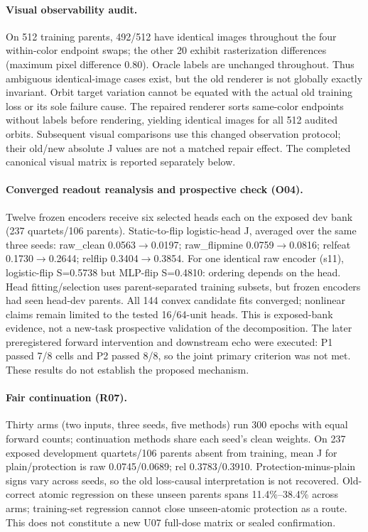 \paragraph{Visual observability audit.} On 512 training parents, 492/512 have identical images throughout the four within-color endpoint swaps; the other 20 exhibit rasterization differences (maximum pixel difference 0.80). Oracle labels are unchanged throughout. Thus ambiguous identical-image cases exist, but the old renderer is not globally exactly invariant. Orbit target variation cannot be equated with the actual old training loss or its sole failure cause. The repaired renderer sorts same-color endpoints without labels before rendering, yielding identical images for all 512 audited orbits. Subsequent visual comparisons use this changed observation protocol; their old/new absolute J values are not a matched repair effect. The completed canonical visual matrix is reported separately below.
\paragraph{Converged readout reanalysis and prospective check (O04).} Twelve frozen encoders receive six selected heads each on the exposed dev bank (237 quartets/106 parents). Static-to-flip logistic-head J, averaged over the same three seeds: raw\_clean 0.0563$\to$0.0197; raw\_flipmine 0.0759$\to$0.0816; relfeat 0.1730$\to$0.2644; relflip 0.3404$\to$0.3854. For one identical raw encoder (s11), logistic-flip S=0.5738 but MLP-flip S=0.4810: ordering depends on the head. Head fitting/selection uses parent-separated training subsets, but frozen encoders had seen head-dev parents. All 144 convex candidate fits converged; nonlinear claims remain limited to the tested 16/64-unit heads. This is exposed-bank evidence, not a new-task prospective validation of the decomposition. The later preregistered forward intervention and downstream echo were executed: P1 passed 7/8 cells and P2 passed 8/8, so the joint primary criterion was not met. These results do not establish the proposed mechanism.
\paragraph{Fair continuation (R07).} Thirty arms (two inputs, three seeds, five methods) run 300 epochs with equal forward counts; continuation methods share each seed's clean weights. On 237 exposed development quartets/106 parents absent from training, mean J for plain/protection is raw 0.0745/0.0689; rel 0.3783/0.3910. Protection-minus-plain signs vary across seeds, so the old loss-causal interpretation is not recovered. Old-correct atomic regression on these unseen parents spans 11.4\%--38.4\% across arms; training-set regression cannot close unseen-atomic protection as a route. This does not constitute a new U07 full-dose matrix or sealed confirmation.
